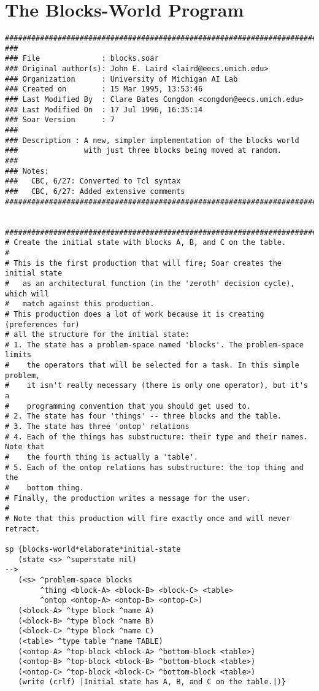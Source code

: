 \chapter{The Blocks-World Program}
\label{BLOCKSCODE}

\footnotesize
\begin{verbatim}
###############################################################################
###
### File              : blocks.soar
### Original author(s): John E. Laird <laird@eecs.umich.edu>
### Organization      : University of Michigan AI Lab
### Created on        : 15 Mar 1995, 13:53:46
### Last Modified By  : Clare Bates Congdon <congdon@eecs.umich.edu>
### Last Modified On  : 17 Jul 1996, 16:35:14
### Soar Version      : 7
###
### Description : A new, simpler implementation of the blocks world
###               with just three blocks being moved at random.
###
### Notes: 
###   CBC, 6/27: Converted to Tcl syntax
###   CBC, 6/27: Added extensive comments
###############################################################################

 
###############################################################################
# Create the initial state with blocks A, B, and C on the table.
#
# This is the first production that will fire; Soar creates the initial state
#   as an architectural function (in the 'zeroth' decision cycle), which will
#   match against this production.
# This production does a lot of work because it is creating (preferences for)
# all the structure for the initial state:
# 1. The state has a problem-space named 'blocks'. The problem-space limits
#    the operators that will be selected for a task. In this simple problem,
#    it isn't really necessary (there is only one operator), but it's a
#    programming convention that you should get used to.
# 2. The state has four 'things' -- three blocks and the table.
# 3. The state has three 'ontop' relations
# 4. Each of the things has substructure: their type and their names. Note that
#    the fourth thing is actually a 'table'.
# 5. Each of the ontop relations has substructure: the top thing and the
#    bottom thing.
# Finally, the production writes a message for the user.
#
# Note that this production will fire exactly once and will never retract.

sp {blocks-world*elaborate*initial-state
   (state <s> ^superstate nil)
-->
   (<s> ^problem-space blocks
        ^thing <block-A> <block-B> <block-C> <table>
        ^ontop <ontop-A> <ontop-B> <ontop-C>)
   (<block-A> ^type block ^name A)
   (<block-B> ^type block ^name B)
   (<block-C> ^type block ^name C)
   (<table> ^type table ^name TABLE)
   (<ontop-A> ^top-block <block-A> ^bottom-block <table>)
   (<ontop-B> ^top-block <block-B> ^bottom-block <table>)
   (<ontop-C> ^top-block <block-C> ^bottom-block <table>)
   (write (crlf) |Initial state has A, B, and C on the table.|)}



\end{verbatim}
